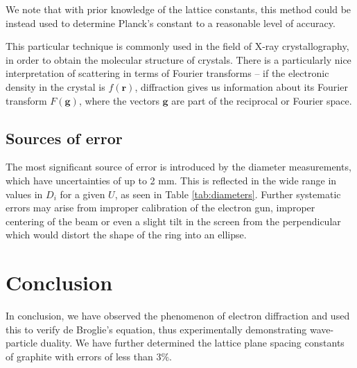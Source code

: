 \documentclass[11pt]{article}
\newcommand\bvec[1]{\boldsymbol{#1}}
\begin{document}
        We note that with prior knowledge of the lattice constants, this method could be instead used to determine Planck's constant to
        a reasonable level of accuracy.

        This particular technique is commonly used in the field of X-ray crystallography, in order to obtain the molecular structure
        of crystals. There is a particularly nice interpretation of scattering in terms of Fourier transforms -- if the 
        electronic density in the crystal is $f(\bvec{r})$, diffraction gives us information about its Fourier transform $F(\bvec{g})$,
        where the vectors $\bvec{g}$ are part of the reciprocal or Fourier space.
        
        \subsection{Sources of error}
        The most significant source of error is introduced by the diameter measurements, which have uncertainties of up to 2 mm.
        This is reflected in the wide range in values in $D_i$ for a given $U$, as seen in Table \ref{tab:diameters}.
        Further systematic errors may arise from improper calibration of the electron gun, improper centering of the beam or even 
        a slight tilt in the screen from the perpendicular which would distort the shape of the ring into an ellipse.
        
        \section{Conclusion}
        In conclusion, we have observed the phenomenon of electron diffraction and used this to verify de Broglie's equation,
        thus experimentally demonstrating wave-particle duality. We have further determined the lattice plane spacing constants of graphite
        with errors of less than $3\%$.

\end{document}
